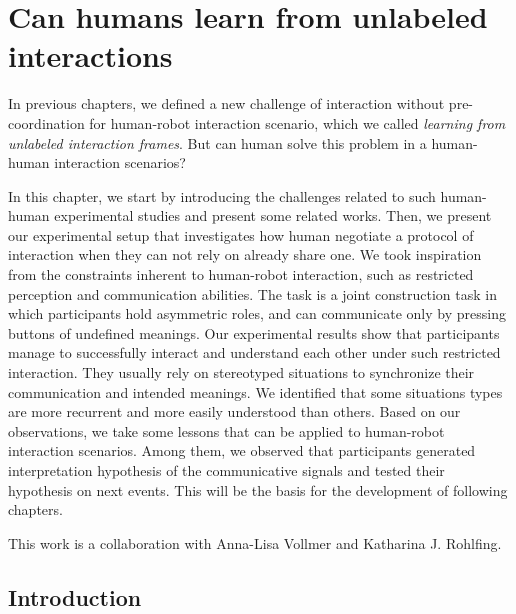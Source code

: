 
\chapter{Can humans learn from unlabeled interactions}
\label{chapter:humanexperiment}
\minitoc


In previous chapters, we defined a new challenge of interaction without pre-coordination for human-robot interaction scenario, which we called \emph{learning from unlabeled interaction frames}. But can human solve this problem in a human-human interaction scenarios?

In this chapter, we start by introducing the challenges related to such human-human experimental studies and present some related works. Then, we present our experimental setup that investigates how human negotiate a protocol of interaction when they can not rely on already share one. We took inspiration from the constraints inherent to human-robot interaction, such as restricted perception and communication abilities. The task is a joint construction task in which participants hold asymmetric roles, and can communicate only by pressing buttons of undefined meanings. Our experimental results show that participants manage to successfully interact and understand each other under such restricted interaction. They usually rely on stereotyped situations to synchronize their communication and intended meanings. We identified that some situations types are more recurrent and more easily understood than others. Based on our observations, we take some lessons that can be applied to human-robot interaction scenarios. Among them, we observed that participants generated interpretation hypothesis of the communicative signals and tested their hypothesis on next events. This will be the basis for the development of following chapters. 

This work is a collaboration with Anna-Lisa Vollmer and Katharina J. Rohlfing.

\section{Introduction}


